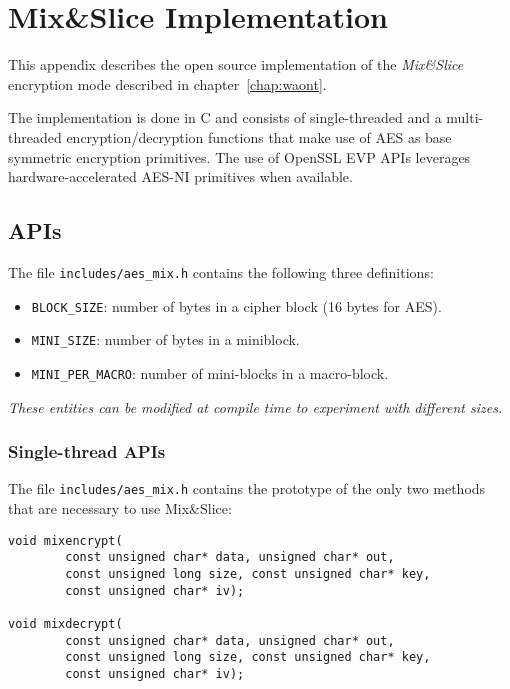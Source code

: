 \chapter[Mix\&Slice Implementation]{Mix\&Slice Implementation}

This appendix describes the open source implementation of the \emph{Mix\&Slice} encryption mode described in chapter~\ref{chap:waont}.

The implementation is done in C and consists of single-threaded and a
multi-threaded encryption/decryption functions that make use of AES as
base symmetric encryption primitives. The use of OpenSSL EVP APIs
leverages hardware-accelerated AES-NI primitives when available.

\section{APIs}\label{usage}

The file \texttt{includes/aes\_mix.h} contains the following three
definitions:

\begin{itemize}
\tightlist
\item
  \texttt{BLOCK\_SIZE}: number of bytes in a cipher block (16 bytes for
  AES).
\item
  \texttt{MINI\_SIZE}: number of bytes in a miniblock.
\item
  \texttt{MINI\_PER\_MACRO}: number of mini-blocks in a macro-block.
\end{itemize}

\emph{These entities can be modified at compile time to experiment with
different sizes.}

\subsection{Single-thread APIs}\label{single-thread-apis}

The file \texttt{includes/aes\_mix.h} contains the prototype of the only
two methods that are necessary to use Mix\&Slice:

\begin{verbatim}
void mixencrypt(
        const unsigned char* data, unsigned char* out,
        const unsigned long size, const unsigned char* key,
        const unsigned char* iv);

void mixdecrypt(
        const unsigned char* data, unsigned char* out,
        const unsigned long size, const unsigned char* key,
        const unsigned char* iv);
\end{verbatim}

